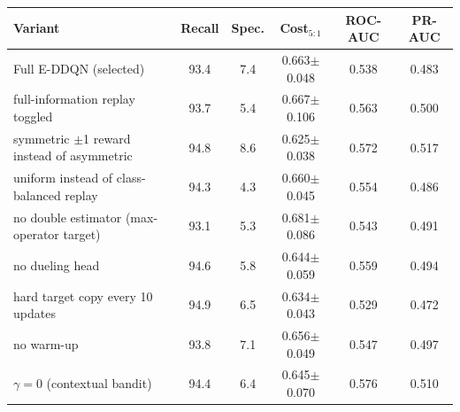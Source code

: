 \begin{tabular}{lccccc}
\toprule
Variant & Recall & Spec. & Cost$_{5:1}$ & ROC-AUC & PR-AUC \\
\midrule
Full E-DDQN (selected) & 93.4 & 7.4 & 0.663$\pm$0.048 & 0.538 & 0.483 \\
\midrule
full-information replay toggled & 93.7 & 5.4 & 0.667$\pm$0.106 & 0.563 & 0.500 \\
symmetric $\pm$1 reward instead of asymmetric & 94.8 & 8.6 & 0.625$\pm$0.038 & 0.572 & 0.517 \\
uniform instead of class-balanced replay & 94.3 & 4.3 & 0.660$\pm$0.045 & 0.554 & 0.486 \\
no double estimator (max-operator target) & 93.1 & 5.3 & 0.681$\pm$0.086 & 0.543 & 0.491 \\
no dueling head & 94.6 & 5.8 & 0.644$\pm$0.059 & 0.559 & 0.494 \\
hard target copy every 10 updates & 94.9 & 6.5 & 0.634$\pm$0.043 & 0.529 & 0.472 \\
no warm-up & 93.8 & 7.1 & 0.656$\pm$0.049 & 0.547 & 0.497 \\
$\gamma=0$ (contextual bandit) & 94.4 & 6.4 & 0.645$\pm$0.070 & 0.576 & 0.510 \\
\bottomrule
\end{tabular}
